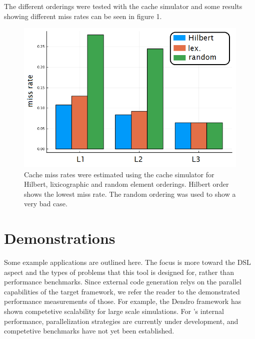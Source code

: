 \documentclass[twoside,leqno,twocolumn]{article}
\begin{document}
The different orderings were tested with the cache simulator and some results showing different miss rates can be seen in figure 1.
\begin{figure}
\label{fig:missrates}
\includegraphics[width=\linewidth]{figures/missrates.png}
\caption{Cache miss rates were estimated using the cache simulator for Hilbert, lixicographic and random element orderings. Hilbert order shows the lowest miss rate. The random ordering was used to show a very bad case.}
\end{figure}

\section{Demonstrations}
Some example applications are outlined here. The focus is more toward the DSL aspect and the types of problems that this tool is designed for, rather than performance benchmarks. Since external code generation relys on the parallel capabilities of the target framework, we refer the reader to the demonstrated performance measurements of those. For example, the Dendro framework has shown competetive scalability for large scale simulations\cite{dendro}\cite{dendro2}. For \FMshop's internal performance, parallelization strategies are currently under development, and competetive benchmarks have not yet been established.
\end{document}
